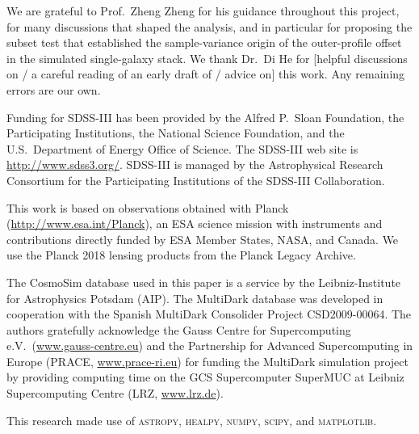 
\begin{acknowledgments}
We are grateful to Prof.\ Zheng Zheng for his guidance throughout this
project, for many discussions that shaped the analysis, and in particular
for proposing the subset test that established the sample-variance origin
of the outer-profile offset in the simulated single-galaxy stack. We thank
Dr.\ Di He for [helpful discussions on / a careful reading of an early draft
of / advice on] this work. %
Any remaining errors are our own.

Funding for SDSS-III has been provided by the Alfred P.\ Sloan Foundation,
the Participating Institutions, the National Science Foundation, and the
U.S.\ Department of Energy Office of Science. The SDSS-III web site is
\url{http://www.sdss3.org/}. SDSS-III is managed by the Astrophysical
Research Consortium for the Participating Institutions of the SDSS-III
Collaboration. %

This work is based on observations obtained with Planck
(\url{http://www.esa.int/Planck}), an ESA science mission with instruments
and contributions directly funded by ESA Member States, NASA, and Canada.
We use the Planck 2018 lensing products from the Planck Legacy Archive.

The CosmoSim database used in this paper is a service by the
Leibniz-Institute for Astrophysics Potsdam (AIP). The MultiDark database
was developed in cooperation with the Spanish MultiDark Consolider Project
CSD2009-00064. The authors gratefully acknowledge the Gauss Centre for
Supercomputing e.V.\ (\url{www.gauss-centre.eu}) and the Partnership for
Advanced Supercomputing in Europe (PRACE, \url{www.prace-ri.eu}) for
funding the MultiDark simulation project by providing computing time on the
GCS Supercomputer SuperMUC at Leibniz Supercomputing Centre
(LRZ, \url{www.lrz.de}).

This research made use of \textsc{astropy}, \textsc{healpy}, \textsc{numpy},
\textsc{scipy}, and \textsc{matplotlib}. %
\end{acknowledgments}
